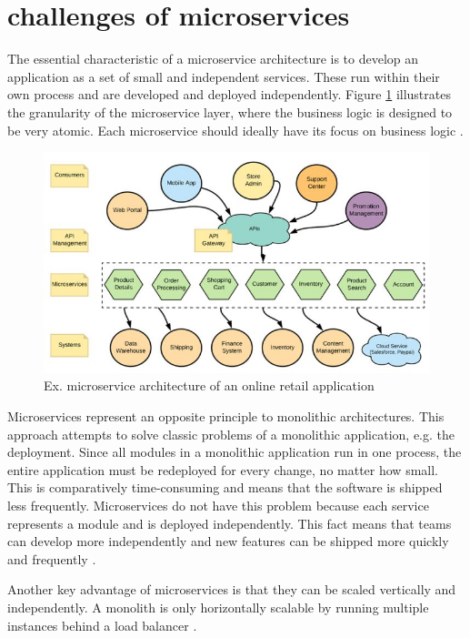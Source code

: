 \section{challenges of microservices}

The essential characteristic of a microservice architecture is to develop an application as a set of small and independent services. These run within their own process and are developed and deployed independently. Figure \ref{fig:microservice} illustrates the granularity of the microservice layer, where the business logic is designed to be very atomic. Each microservice should ideally have its focus on business logic \cite[p. 7]{sm3}.

\begin{figure}
    \includegraphics[width=\columnwidth]{img/microservice.JPG}
    \caption{Ex. microservice architecture of an online retail application \cite[p. 7]{sm3}}
    \label{fig:microservice}
\end{figure}

Microservices represent an opposite principle to monolithic architectures. This approach attempts to solve classic problems of a monolithic application, e.g. the deployment. Since all modules in a monolithic application run in one process, the entire application must be redeployed for every change, no matter how small. This is comparatively time-consuming and means that the software is shipped less frequently. Microservices do not have this problem because each service represents a module and is deployed independently. This fact means that teams can develop more independently and new features can be shipped more quickly and frequently \cite{fowler}.

Another key advantage of microservices is that they can be scaled vertically and independently. A monolith is only horizontally scalable by running multiple instances behind a load balancer \cite{fowler}.

